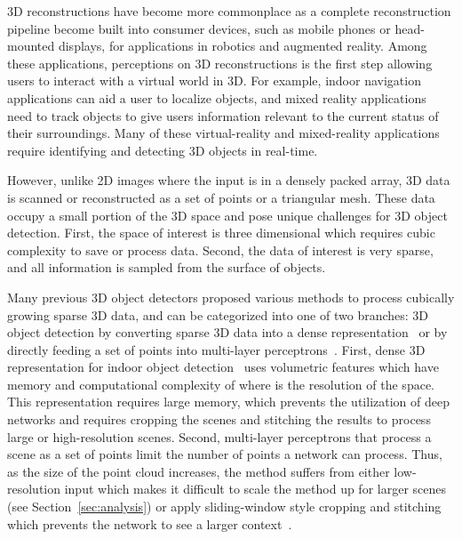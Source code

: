 \documentclass[runningheads]{llncs}
\begin{document}
3D reconstructions have become more commonplace as a complete reconstruction pipeline become built into consumer devices, such as mobile phones or head-mounted displays, for applications in robotics and augmented reality. Among these applications, perceptions on 3D reconstructions is the first step allowing users to interact with a virtual world in 3D. For example, indoor navigation applications can aid a user to localize objects, and mixed reality applications need to track objects to give users information relevant to the current status of their surroundings.
Many of these virtual-reality and mixed-reality applications require identifying and detecting 3D objects in real-time.











However, unlike 2D images where the input is in a densely packed array, 3D data is scanned or reconstructed as a set of points or a triangular mesh. These data occupy a small portion of the 3D space and pose unique challenges for 3D object detection. First, the space of interest is three dimensional which requires cubic complexity to save or process data. Second, the data of interest is very sparse, and all information is sampled from the surface of objects. 





Many previous 3D object detectors proposed various methods to process cubically growing sparse 3D data, and can be categorized into one of two branches: 3D object detection by converting sparse 3D data into a dense representation~\cite{maturana_iros_2015,DeepSlidingShapes,armeni_cvpr16,li2016vehicle,hou20193d} or by directly feeding a set of points into multi-layer perceptrons~\cite{qi2019deep,yang2019learning}. First, dense 3D representation for indoor object detection~\cite{DeepSlidingShapes,armeni_cvpr16,hou20193d} uses volumetric features which have memory and computational complexity of  where  is the resolution of the space. This representation requires large memory, which prevents the utilization of deep networks and requires cropping the scenes and stitching the results to process large or high-resolution scenes. Second, multi-layer perceptrons that process a scene as a set of points limit the number of points a network can process. Thus, as the size of the point cloud increases, the method suffers from either low-resolution input which makes it difficult to scale the method up for larger scenes (see Section~\ref{sec:analysis}) or apply sliding-window style cropping and stitching which prevents the network to see a larger context~\cite{yang2019learning}.
\end{document}
